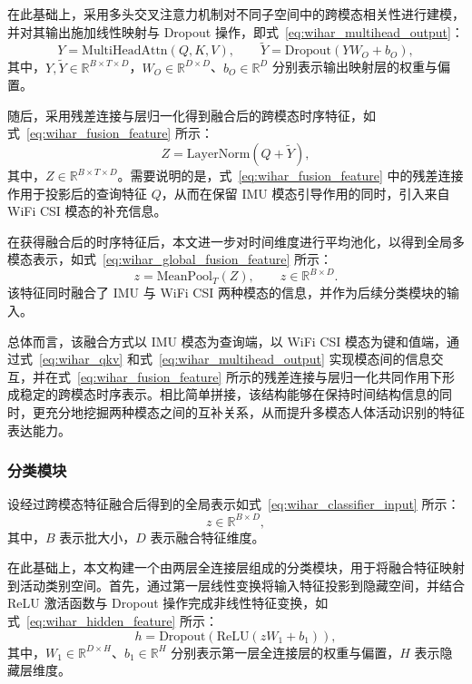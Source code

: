 在此基础上，采用多头交叉注意力机制对不同子空间中的跨模态相关性进行建模，并对其输出施加线性映射与 Dropout 操作，即式~\eqref{eq:wihar_multihead_output}：
\begin{equation}
Y = \mathrm{MultiHeadAttn}(Q, K, V),\qquad
\tilde{Y} = \mathrm{Dropout}(Y W_O + b_O),
\label{eq:wihar_multihead_output}
\end{equation}
其中，$Y,\tilde{Y} \in \mathbb{R}^{B \times T \times D}$，$W_O \in \mathbb{R}^{D \times D}$、$b_O \in \mathbb{R}^{D}$ 分别表示输出映射层的权重与偏置。

随后，采用残差连接与层归一化得到融合后的跨模态时序特征，如式~\eqref{eq:wihar_fusion_feature} 所示：
\begin{equation}
Z = \mathrm{LayerNorm}(Q + \tilde{Y}),
\label{eq:wihar_fusion_feature}
\end{equation}
其中，$Z \in \mathbb{R}^{B \times T \times D}$。需要说明的是，式~\eqref{eq:wihar_fusion_feature} 中的残差连接作用于投影后的查询特征 $Q$，从而在保留 IMU 模态引导作用的同时，引入来自 WiFi CSI 模态的补充信息。

在获得融合后的时序特征后，本文进一步对时间维度进行平均池化，以得到全局多模态表示，如式~\eqref{eq:wihar_global_fusion_feature} 所示：
\begin{equation}
z = \mathrm{MeanPool}_T(Z),\qquad z \in \mathbb{R}^{B \times D}.
\label{eq:wihar_global_fusion_feature}
\end{equation}
该特征同时融合了 IMU 与 WiFi CSI 两种模态的信息，并作为后续分类模块的输入。

总体而言，该融合方式以 IMU 模态为查询端，以 WiFi CSI 模态为键和值端，通过式~\eqref{eq:wihar_qkv} 和式~\eqref{eq:wihar_multihead_output} 实现模态间的信息交互，并在式~\eqref{eq:wihar_fusion_feature} 所示的残差连接与层归一化共同作用下形成稳定的跨模态时序表示。相比简单拼接，该结构能够在保持时间结构信息的同时，更充分地挖掘两种模态之间的互补关系，从而提升多模态人体活动识别的特征表达能力。

\subsubsection{分类模块}{}

设经过跨模态特征融合后得到的全局表示如式~\eqref{eq:wihar_classifier_input} 所示：
\begin{equation}
z \in \mathbb{R}^{B \times D},
\label{eq:wihar_classifier_input}
\end{equation}
其中，$B$ 表示批大小，$D$ 表示融合特征维度。

在此基础上，本文构建一个由两层全连接层组成的分类模块，用于将融合特征映射到活动类别空间。首先，通过第一层线性变换将输入特征投影到隐藏空间，并结合 ReLU 激活函数与 Dropout 操作完成非线性特征变换，如式~\eqref{eq:wihar_hidden_feature} 所示：
\begin{equation}
h = \mathrm{Dropout}\!\left(\mathrm{ReLU}(zW_1+b_1)\right),
\label{eq:wihar_hidden_feature}
\end{equation}
其中，$W_1 \in \mathbb{R}^{D \times H}$、$b_1 \in \mathbb{R}^{H}$ 分别表示第一层全连接层的权重与偏置，$H$ 表示隐藏层维度。


